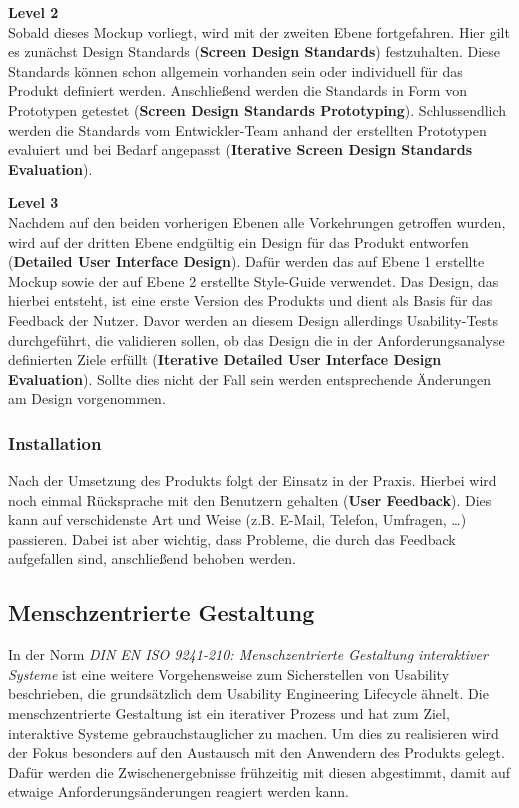 \documentclass[utf8,biblatex]{lni}
\begin{document}
\textbf{Level 2}\\
Sobald dieses Mockup vorliegt, wird mit der zweiten Ebene fortgefahren. Hier gilt es zunächst Design Standards (\textbf{Screen Design Standards}) festzuhalten. Diese Standards können schon allgemein vorhanden sein oder individuell für das Produkt definiert werden. Anschließend werden die Standards in Form von Prototypen getestet (\textbf{Screen Design Standards Prototyping}). Schlussendlich werden die Standards vom Entwickler-Team anhand der erstellten Prototypen evaluiert und bei Bedarf angepasst (\textbf{Iterative Screen Design Standards Evaluation}).

\textbf{Level 3}\\
Nachdem auf den beiden vorherigen Ebenen alle Vorkehrungen getroffen wurden, wird auf der dritten Ebene endgültig ein Design für das Produkt entworfen (\textbf{Detailed User Interface Design}). Dafür werden das auf Ebene 1 erstellte Mockup sowie der auf Ebene 2 erstellte Style-Guide verwendet. Das Design, das hierbei entsteht, ist eine erste Version des Produkts und dient als Basis für das Feedback der Nutzer.
Davor werden an diesem Design allerdings Usability-Tests durchgeführt, die validieren sollen, ob das Design die in der Anforderungsanalyse definierten Ziele erfüllt (\textbf{Iterative Detailed User Interface Design Evaluation}). Sollte dies nicht der Fall sein werden entsprechende Änderungen am Design vorgenommen.


\subsubsection{Installation}
Nach der Umsetzung des Produkts folgt der Einsatz in der Praxis. Hierbei wird noch einmal Rücksprache mit den Benutzern gehalten (\textbf{User Feedback}). Dies kann auf verschidenste Art und Weise (z.B. E-Mail, Telefon, Umfragen, \dots) passieren. Dabei ist aber wichtig, dass Probleme, die durch das Feedback aufgefallen sind, anschließend behoben werden. 


\subsection{Menschzentrierte Gestaltung} \label{chp:mg}
In der Norm \textit{DIN EN ISO 9241-210: Menschzentrierte Gestaltung interaktiver Systeme} ist eine weitere Vorgehensweise zum Sicherstellen von Usability beschrieben, die grundsätzlich dem Usability Engineering Lifecycle ähnelt. Die menschzentrierte Gestaltung ist ein iterativer Prozess und hat zum Ziel, interaktive Systeme gebrauchstauglicher zu machen. Um dies zu realisieren wird der Fokus besonders auf den Austausch mit den Anwendern des Produkts gelegt. Dafür werden die Zwischenergebnisse frühzeitig mit diesen abgestimmt, damit auf etwaige Anforderungsänderungen reagiert werden kann.
\end{document}
